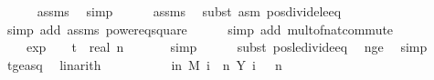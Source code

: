 \begin{isabellebody}
\ \ \ \ \isamarkupfalse%
\ assms{\isacharparenleft}{\kern0pt}{}{\isacharparenright}{\kern0pt}\ \isamarkupfalse%
\ simp\isanewline
\ \ \ \ \isamarkupfalse%
\ assms{\isacharparenleft}{\kern0pt}{}{\isacharparenright}{\kern0pt}\ \isamarkupfalse%
\ {\isacharparenleft}{\kern0pt}subst\ {\isacharparenleft}{\kern0pt}asm{\isacharparenright}{\kern0pt}\ pos{\isacharunderscore}{\kern0pt}divide{\isacharunderscore}{\kern0pt}le{\isacharunderscore}{\kern0pt}eq{\isacharparenright}{\kern0pt}\ \isanewline
\ \ \ \ \ \isamarkupfalse%
\ {\isacharparenleft}{\kern0pt}simp\ add{\isacharcolon}{\kern0pt}\ assms{\isacharparenleft}{\kern0pt}{}{\isacharparenright}{\kern0pt}\ power{}{\isacharunderscore}{\kern0pt}eq{\isacharunderscore}{\kern0pt}square{\isacharparenright}{\kern0pt}\isanewline
\ \ \ \ \isamarkupfalse%
\ {\isacharparenleft}{\kern0pt}simp\ add{\isacharcolon}{\kern0pt}\ mult{\isacharunderscore}{\kern0pt}of{\isacharunderscore}{\kern0pt}nat{\isacharunderscore}{\kern0pt}commute{\isacharparenright}{\kern0pt}\isanewline
\ \ \isamarkupfalse%
\ \isamarkupfalse%
\ {\isachardoublequoteopen}{\isachardot}{\kern0pt}{\isachardot}{\kern0pt}{\isachardot}{\kern0pt}\ {\isasymle}\ {}{\isacharminus}{\kern0pt}\ exp\ {\isacharparenleft}{\kern0pt}{\isacharminus}{\kern0pt}\ {\isacharparenleft}{\kern0pt}{}\ {\isacharasterisk}{\kern0pt}\ t\ {\isacharslash}{\kern0pt}\ real\ n{\isacharparenright}{\kern0pt}{\isacharparenright}{\kern0pt}{\isachardoublequoteclose}\ \isanewline
\ \ \ \ \isamarkupfalse%
\ simp\isanewline
\ \ \ \ \isamarkupfalse%
\ {\isacharparenleft}{\kern0pt}subst\ pos{\isacharunderscore}{\kern0pt}le{\isacharunderscore}{\kern0pt}divide{\isacharunderscore}{\kern0pt}eq{\isacharparenright}{\kern0pt}\ \isamarkupfalse%
\ n{\isacharunderscore}{\kern0pt}ge{\isacharunderscore}{\kern0pt}{}\ \isamarkupfalse%
\ simp\isanewline
\ \ \ \ \isamarkupfalse%
\ t{\isacharunderscore}{\kern0pt}ge{\isacharunderscore}{\kern0pt}a{\isacharunderscore}{\kern0pt}sq\ \isamarkupfalse%
\ linarith\isanewline
\ \ \isamarkupfalse%
\ \isamarkupfalse%
\ {\isachardoublequoteopen}{\isachardot}{\kern0pt}{\isachardot}{\kern0pt}{\isachardot}{\kern0pt}\ {\isasymle}\ {}\ {\isacharminus}{\kern0pt}\ {\isasymP}{\isacharparenleft}{\kern0pt}{\isasymomega}\ in\ M{\isachardot}{\kern0pt}\ {\isacharparenleft}{\kern0pt}{\isasymSum}i\ {\isacharequal}{\kern0pt}\ {}{\isachardot}{\kern0pt}{\isachardot}{\kern0pt}{\isacharless}{\kern0pt}n{\isachardot}{\kern0pt}\ Y\ i\ {\isasymomega}{\isacharparenright}{\kern0pt}\ {\isasymle}\ n{\isacharslash}{\kern0pt}{}{\isacharparenright}{\kern0pt}{\isachardoublequoteclose}\ \isanewline

\end{isabellebody}
